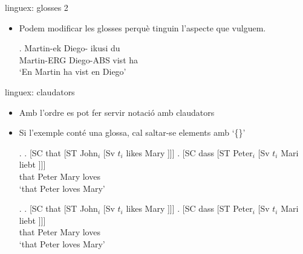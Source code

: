 \begin{frame}[fragile]{linguex: glosses 2}
\begin{itemize}
\item Podem modificar les glosses perquè tinguin l'aspecte que vulguem.
\begin{exampletwouptiny}
\renewcommand{\eachwordone}{\itshape}
\renewcommand{\eachwordtwo}{\tiny}

\exg.
Martin-ek Diego-\zero{} ikusi du \\
Martin-ERG Diego-ABS vist ha \\
\glt `En Martin ha vist en Diego'


\end{exampletwouptiny}
\end{itemize}

\end{frame}

\begin{frame}[fragile]{linguex: claudators}
\begin{itemize}
\item Amb l'ordre  es pot fer servir notació amb claudators
\item Si l'exemple conté una glossa, cal saltar-se elements amb `\{\}'
\begin{MyMinted}
\exi.
\a.  [SC that [ST John$_i$  [Sv $t_i$ likes Mary ]]]
\bg. [SC dass [ST Peter$_i$ [Sv $t_i$ Mari liebt ]]] \\
{} that {} Peter {} {} Mary loves \\
\glt `that Peter loves Mary'
\end{MyMinted}
\exi.
\a.  [SC that [ST John$_i$  [Sv $t_i$ likes Mary ]]]
\bg. [SC dass [ST Peter$_i$ [Sv $t_i$ Mari liebt ]]] \\
{} that {} Peter {} {} Mary loves \\
\glt `that Peter loves Mary'

\end{itemize}

\end{frame}

